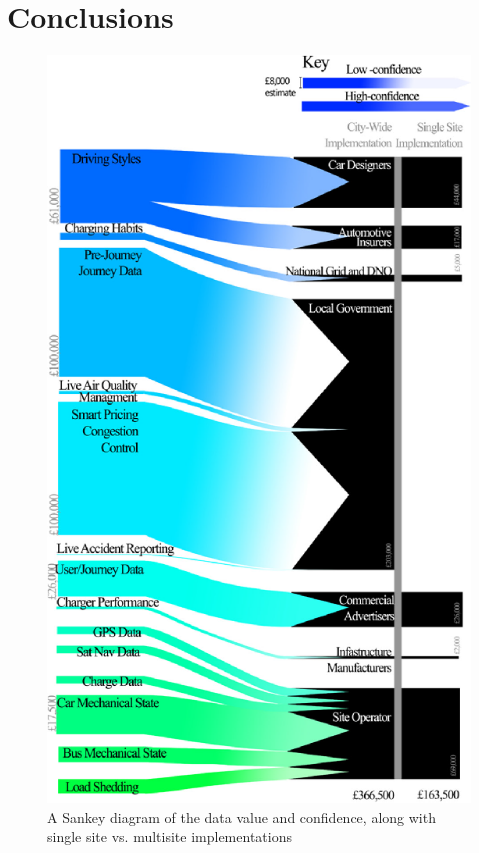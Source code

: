 \documentclass[conference]{IEEEtran}
\begin{document}
\section{Conclusions} 

\begin{figure}[!htp]
\centering
\includegraphics[width=\columnwidth]{images/sankey.png}
\caption{A Sankey diagram of the data value and confidence, along with
  single site vs. multisite implementations}
\label{fig:sankey}
\end{figure}
\end{document}
